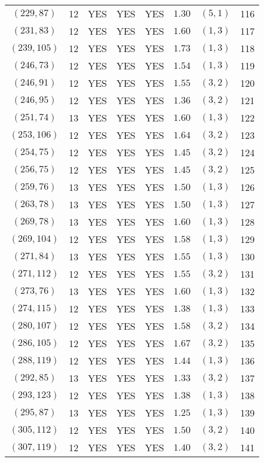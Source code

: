 \begin{longtable}{|c|c|c|c|c|c|c|c|}
$(229,87)$ & 12 & YES & YES & YES & $1.30$ & $(5,1)$ & 116\\
$(231,83)$ & 12 & YES & YES & YES & $1.60$ & $(1,3)$ & 117\\
$(239,105)$ & 12 & YES & YES & YES & $1.73$ & $(1,3)$ & 118\\
$(246,73)$ & 12 & YES & YES & YES & $1.54$ & $(1,3)$ & 119\\
$(246,91)$ & 12 & YES & YES & YES & $1.55$ & $(3,2)$ & 120\\
$(246,95)$ & 12 & YES & YES & YES & $1.36$ & $(3,2)$ & 121\\
$(251,74)$ & 13 & YES & YES & YES & $1.60$ & $(1,3)$ & 122\\
$(253,106)$ & 12 & YES & YES & YES & $1.64$ & $(3,2)$ & 123\\
$(254,75)$ & 12 & YES & YES & YES & $1.45$ & $(3,2)$ & 124\\
$(256,75)$ & 12 & YES & YES & YES & $1.45$ & $(3,2)$ & 125\\
$(259,76)$ & 13 & YES & YES & YES & $1.50$ & $(1,3)$ & 126\\
$(263,78)$ & 13 & YES & YES & YES & $1.50$ & $(1,3)$ & 127\\
$(269,78)$ & 13 & YES & YES & YES & $1.60$ & $(1,3)$ & 128\\
$(269,104)$ & 12 & YES & YES & YES & $1.58$ & $(1,3)$ & 129\\
$(271,84)$ & 13 & YES & YES & YES & $1.55$ & $(1,3)$ & 130\\
$(271,112)$ & 12 & YES & YES & YES & $1.55$ & $(3,2)$ & 131\\
$(273,76)$ & 13 & YES & YES & YES & $1.60$ & $(1,3)$ & 132\\
$(274,115)$ & 12 & YES & YES & YES & $1.38$ & $(1,3)$ & 133\\
$(280,107)$ & 12 & YES & YES & YES & $1.58$ & $(3,2)$ & 134\\
$(286,105)$ & 12 & YES & YES & YES & $1.67$ & $(3,2)$ & 135\\
$(288,119)$ & 12 & YES & YES & YES & $1.44$ & $(1,3)$ & 136\\
$(292,85)$ & 13 & YES & YES & YES & $1.33$ & $(3,2)$ & 137\\
$(293,123)$ & 12 & YES & YES & YES & $1.38$ & $(1,3)$ & 138\\
$(295,87)$ & 13 & YES & YES & YES & $1.25$ & $(1,3)$ & 139\\
$(305,112)$ & 12 & YES & YES & YES & $1.50$ & $(3,2)$ & 140\\
$(307,119)$ & 12 & YES & YES & YES & $1.40$ & $(3,2)$ & 141\\

\end{longtable}
